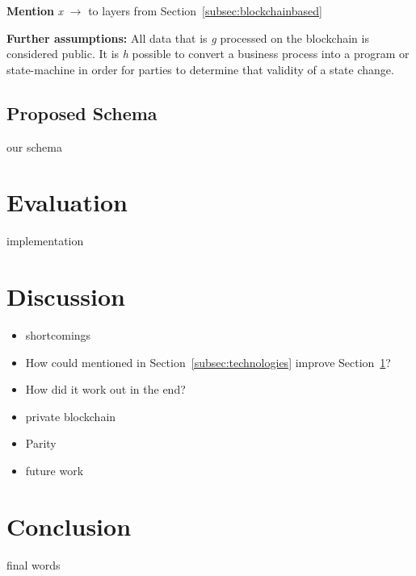 \documentclass[runningheads]{llncs}
\newcommand{\ber}[1]{\textit{#1}}
\newcommand{\refsec}[1]{Section~\ref{#1}}
\begin{document}
\textbf{Mention} \ber{x} $ \rightarrow $ to layers from \refsec{subsec:blockchainbased}

\bigbreak
\textbf{Further assumptions:}
All data that is \ber{g} processed on the blockchain is considered public. It is \ber{h} possible to convert a business process into a program or state-machine in order for parties to determine that validity of a state change.




\subsection{Proposed Schema} \label{subsec:schema}

our schema


\section{Evaluation} \label{sec:eval}

implementation


\section{Discussion} \label{sec:discussion}

\begin{itemize}
    \item shortcomings
    \item How could mentioned in \refsec{subsec:technologies} improve \refsec{sec:eval}?
    \item How did it work out in the end? 
    \item private blockchain
    \item Parity
    \item future work
\end{itemize}


\section{Conclusion} \label{sec:conclusion}

final words




\end{document}
